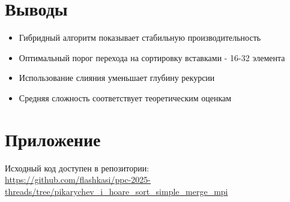 \documentclass[a4paper,12pt]{article}
\begin{document}
\section{Выводы}
\begin{itemize}
    \item Гибридный алгоритм показывает стабильную производительность
    \item Оптимальный порог перехода на сортировку вставками - 16-32 элемента
    \item Использование слияния уменьшает глубину рекурсии
    \item Средняя сложность соответствует теоретическим оценкам
\end{itemize}

\section*{Приложение}
Исходный код доступен в репозитории: \\
\url{https://github.com/flashkasi/ppc-2025-threads/tree/pikarychev_i_hoare_sort_simple_merge_mpi}
\end{document}

